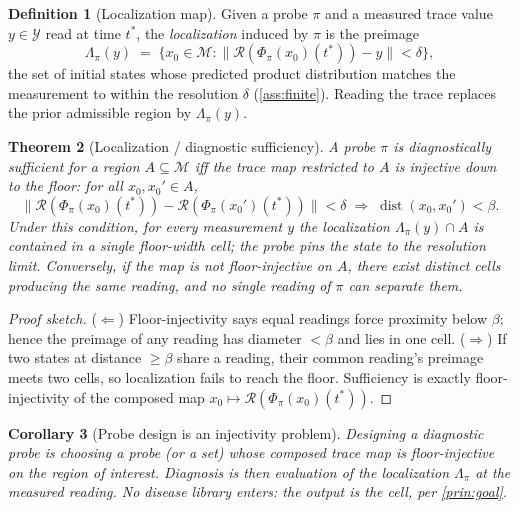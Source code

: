 \documentclass[11pt,a4paper]{article}
\theoremstyle{thmstyle}
\newtheorem{theorem}{Theorem}[section]
\newtheorem{corollary}[theorem]{Corollary}
\theoremstyle{definition}
\newtheorem{definition}[theorem]{Definition}
\theoremstyle{remark}
\newcommand{\Man}{\mathcal{M}}          %
\newcommand{\st}{x}                     %
\newcommand{\probe}{\pi}                %
\newcommand{\Rd}{\mathcal{R}}           %
\newcommand{\loc}{\Lambda}              %
\newcommand{\flo}{\beta}                %
\newcommand{\norm}[1]{\lVert#1\rVert}
\newcommand{\set}[1]{\{#1\}}
\DeclareMathOperator{\dist}{dist}
\begin{document}
\begin{definition}[Localization map]
\label{def:loc}
Given a probe $\probe$ and a measured trace value $y\in\mathcal{Y}$ read at
time $t^\ast$, the \emph{localization} induced by $\probe$ is the preimage
\[
\loc_\probe(y)\;=\;\set{\st_0\in\Man :
\norm{\Rd(\Phi_\probe(\st_0)(t^\ast))-y}<\delta},
\]
the set of initial states whose predicted product distribution matches the
measurement to within the resolution $\delta$ (\cref{ass:finite}). Reading
the trace replaces the prior admissible region by $\loc_\probe(y)$.
\end{definition}

\begin{theorem}[Localization / diagnostic sufficiency]
\label{thm:localization}
A probe $\probe$ is \emph{diagnostically sufficient} for a region
$A\subseteq\Man$ iff the trace map restricted to $A$ is injective down to
the floor: for all $\st_0,\st_0'\in A$,
\[
\norm{\Rd(\Phi_\probe(\st_0)(t^\ast))-\Rd(\Phi_\probe(\st_0')(t^\ast))}<\delta
\;\Longrightarrow\;
\dist(\st_0,\st_0')<\flo .
\]
Under this condition, for every measurement $y$ the localization
$\loc_\probe(y)\cap A$ is contained in a single floor-width cell; the probe
pins the state to the resolution limit. Conversely, if the map is not
floor-injective on $A$, there exist distinct cells producing the same
reading, and no single reading of $\probe$ can separate them.
\end{theorem}

\begin{proof}[Proof sketch]
($\Leftarrow$) Floor-injectivity says equal readings force proximity below
$\flo$; hence the preimage of any reading has diameter $<\flo$ and lies in
one cell. ($\Rightarrow$) If two states at distance $\ge\flo$ share a
reading, their common reading's preimage meets two cells, so localization
fails to reach the floor. Sufficiency is exactly floor-injectivity of the
composed map $\st_0\mapsto\Rd(\Phi_\probe(\st_0)(t^\ast))$.
\end{proof}

\begin{corollary}[Probe design is an injectivity problem]
\label{cor:design}
Designing a diagnostic probe is choosing a probe (or a set) whose composed
trace map is floor-injective on the region of interest. Diagnosis is then
evaluation of the localization $\loc_\probe$ at the measured reading. No
disease library enters: the output is the cell, per \cref{prin:goal}.
\end{corollary}
\end{document}
